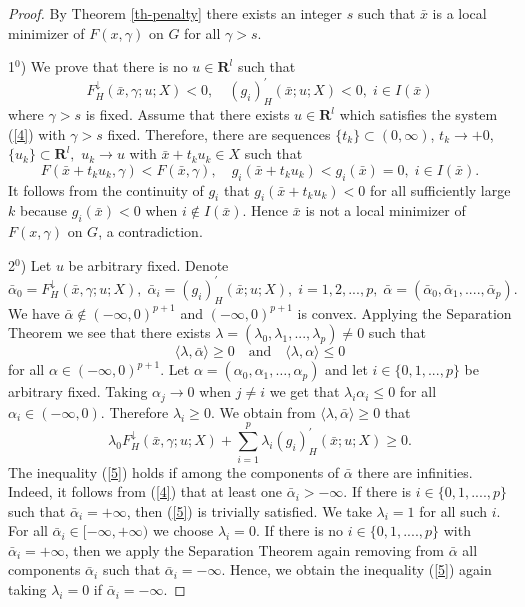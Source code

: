 \documentclass[12pt]{article}
\def\E{\mathbf R^l}
\def\ld#1{#1^{\downarrow}_{H}}
\def\d#1{#1^{\prime}_{H}}
\newcommand{\scalpr}[2]{\langle#1,#2\rangle}
\begin{document}
\begin{proof}
By Theorem \ref{th-penalty} there exists an integer $s$ such that $\bar x$
is a local minimizer of $F(x,\gamma)$ on $G$ for all $\gamma>s$.

1$^0$)  We prove that there is no $u\in\E$ such that
\begin{equation}\label{4}
\ld F (\bar x,\gamma;u;X)<0,\quad \d {(g_i)}(\bar x;u;X)<0,\; i\in I(\bar x)
\end{equation}
where $\gamma>s$ is fixed.
Assume that there exists $u\in\E$ which satisfies the system (\ref{4}) with
$\gamma>s$ fixed.
Therefore, there are sequences $\{t_k\}\subset (0,\infty)$, $t_k\to +0$,
$\{u_k\}\subset\E,$ $u_k\to u$ with $\bar x+t_ku_k\in X$ such that
\[
F(\bar x+t_ku_k,\gamma)<F(\bar x,\gamma), \quad
g_i(\bar x+t_ku_k)<g_i(\bar x)=0,\; i\in I(\bar x).
\]
It follows from the continuity of $g_i$ that
$g_i(\bar x+t_ku_k)<0$ for all sufficiently large $k$ because $g_i(\bar x)<0$
when $i\notin I(\bar x)$. Hence $\bar x$ is not a local minimizer of
$F(x,\gamma)$ on $G$, a contradiction.

2$^0$)  Let $u$ be arbitrary fixed. Denote
\[
\bar\alpha_0=\ld F (\bar x,\gamma;u;X),\;
\bar\alpha_i=\d {(g_i)}(\bar x;u;X), \; i=1,2,...,p,\;
\bar\alpha=(\bar\alpha_0,\bar\alpha_1,....,\bar\alpha_p).
\]
We have $\bar\alpha\notin(-\infty,0)^{p+1}$ and $(-\infty,0)^{p+1}$ is convex.
Applying the Separation Theorem we see that there exists
$\lambda=(\lambda_0,\lambda_1,...,\lambda_p)\ne 0$ such that
\[
\scalpr{\lambda}{\bar\alpha}\ge 0\quad\textrm{and}\quad\scalpr{\lambda}{\alpha}\le 0
\]
for all $\alpha\in(-\infty,0)^{p+1}$.  Let $\alpha=(\alpha_0,\alpha_1,\dots,\alpha_p)$ and    let $i\in\{0,1,...,p\}$ be arbitrary fixed.
Taking $\alpha_j\to 0$ when $j\ne i$ we get that $\lambda_i\alpha_i\le 0$
for all $\alpha_i\in(-\infty,0)$. Therefore $\lambda_i\ge 0$.
We obtain from $\scalpr{\lambda}{\bar\alpha}\ge 0$ that
\begin{equation}\label{5}
\lambda_0\ld F(\bar x,\gamma;u;X)+\sum_{i=1}^p\lambda_i\d {(g_i)} (\bar x;u;X)\ge 0.
\end{equation}
The inequality (\ref{5}) holds if among the components of $\bar\alpha$
there are infinities. Indeed, it follows from (\ref{4}) that at least one
$\bar\alpha_i>-\infty$. If there is  $i\in\{0,1,....,p\}$ such that
$\bar\alpha_i=+\infty$, then (\ref{5}) is trivially satisfied. We take
$\lambda_i=1$ for all such $i$.
For all $\bar\alpha_i\in[-\infty,+\infty)$ we choose $\lambda_i=0$.
If there is no $i\in\{0,1,....,p\}$ with $\bar\alpha_i=+\infty$,
then  we apply the
Separation Theorem again removing from $\bar\alpha$ all components
$\bar\alpha_i$ such that $\bar\alpha_i=-\infty$. Hence, we obtain the inequality
(\ref{5}) again taking $\lambda_i=0$ if $\bar\alpha_i=-\infty$.

\end{proof}
\end{document}
